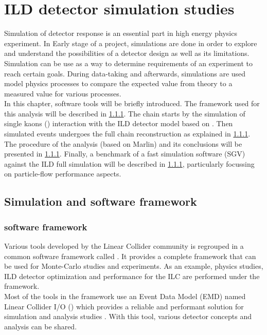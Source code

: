 \chapter{ILD detector simulation studies}

Simulation of detector response is an essential part in high energy physics experiment. In Early stage of a project, simulations are done in order to explore and understand the possibilities of a detector design as well as its limitations. Simulation can be use as a way to determine requirements of an experiment to reach certain goals. During data-taking and afterwards, simulations are used model physics processes to compare  the expected value from theory to a measured value for various processes.\\

In this chapter, software tools will be briefly introduced. The \ilcsoft framework used for this analysis will be described in \ref{}. The chain starts by the simulation of single kaons (\kzeroL) interaction with the ILD detector model based on \geant. Then simulated events undergoes the full chain reconstruction as explained in \ref{}. The procedure of the analysis (based on Marlin) and its conclusions will be presented in \ref{}.
Finally, a benchmark of a fast simulation software (SGV) against the ILD full simulation will be described in \ref{}, particularly focussing on particle-flow performance aspects.

\section{Simulation and software framework}

\subsection{\ilcsoft software framework}

Various tools developed by the Linear Collider community is regrouped in a common software framework called \ilcsoft \cite{ILCSoftPortal}. It provides a complete framework that can be used for Monte-Carlo studies and experiments. As an example, physics studies, ILD detector optimization and performance for the ILC are performed under the \ilcsoft framework.\\

Most of the tools in the framework use an Event Data Model (EMD) named Linear Collider I/O (\lcio) which provides a reliable and performant solution for simulation and analysis studies \cite{Gaede:2003ip}. With this tool, various detector concepts and analysis can be shared.

